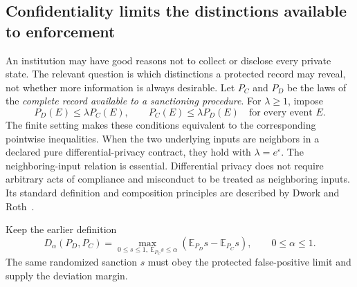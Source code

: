 \documentclass[11pt,letterpaper]{article}
\theoremstyle{plain}
\theoremstyle{definition}
\theoremstyle{remark}
\newcommand{\E}{\mathbb E}
\begin{document}
\subsection{Confidentiality limits the distinctions available to enforcement}\label{sec:privacy-enforcement}

An institution may have good reasons not to collect or disclose every private state. The relevant question is which distinctions a protected record may reveal, not whether more information is always desirable. Let $P_C$ and $P_D$ be the laws of the \emph{complete record available to a sanctioning procedure}. For $\lambda\ge1$, impose
\begin{equation}\label{eq:pairwise-privacy}
 P_D(E)\le\lambda P_C(E),\qquad P_C(E)\le\lambda P_D(E)
 \quad\text{for every event }E.
\end{equation}
The finite setting makes these conditions equivalent to the corresponding pointwise inequalities. When the two underlying inputs are neighbors in a declared pure differential-privacy contract, they hold with $\lambda=e^\varepsilon$. The neighboring-input relation is essential. Differential privacy does not require arbitrary acts of compliance and misconduct to be treated as neighboring inputs. Its standard definition and composition principles are described by Dwork and Roth~\cite{dworkroth}.

Keep the earlier definition
\[
D_\alpha(P_D,P_C)=\max_{0\le s\le1,\ \E_{P_C}s\le\alpha}
       (\E_{P_D}s-\E_{P_C}s),\qquad 0\le\alpha\le1.
\]
The same randomized sanction $s$ must obey the protected false-positive limit and supply the deviation margin.
\end{document}
